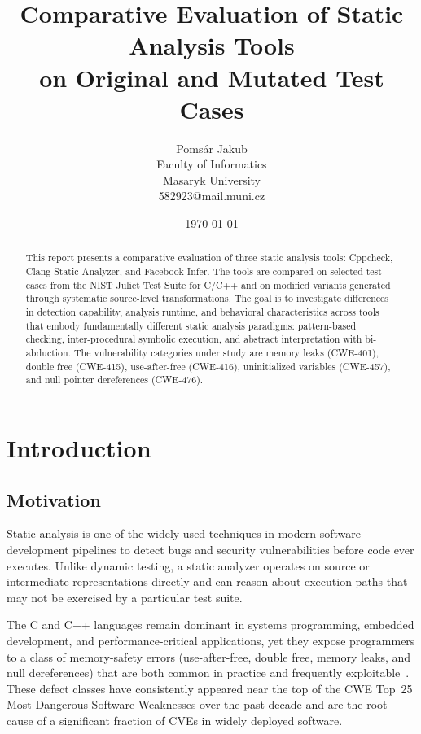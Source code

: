 \documentclass[11pt,a4paper]{article}
\title{Comparative Evaluation of Static Analysis Tools\\
on Original and Mutated Test Cases }
\author{Pomsár Jakub\\   
Faculty of Informatics\\   
Masaryk University\\
582923@mail.muni.cz }
\date{\today}
\begin{document}
\maketitle

\begin{abstract} This report presents a comparative evaluation of three static analysis tools: Cppcheck, Clang Static Analyzer, and Facebook Infer. The tools are compared on selected test cases from the NIST Juliet Test Suite for C/C++ and on modified variants generated through systematic source-level transformations. The goal is to investigate differences in detection capability, analysis runtime, and behavioral characteristics across tools that embody fundamentally different static analysis paradigms: pattern-based checking, inter-procedural symbolic execution, and abstract interpretation with bi-abduction. The vulnerability categories under study are memory leaks (CWE-401), double free (CWE-415), use-after-free (CWE-416), uninitialized variables (CWE-457), and null pointer dereferences (CWE-476).
\end{abstract}

\tableofcontents
\newpage

\section{Introduction} 
\subsection{Motivation}

Static analysis is one of the widely used techniques in modern software development pipelines to detect bugs and security vulnerabilities before code ever executes. Unlike dynamic testing, a static analyzer operates on source or intermediate representations directly and can reason about execution paths that may not be exercised by a particular test suite.

The C and C++ languages remain dominant in systems programming, embedded development, and performance-critical applications, yet they expose programmers to a class of memory-safety errors (use-after-free, double free, memory leaks, and null dereferences) that are both common in practice and frequently exploitable~\cite{cwe2023}. These defect classes have consistently appeared near the top of the CWE Top~25 Most Dangerous Software Weaknesses over the past decade and are the root cause of a significant fraction of CVEs in widely deployed software.
\end{document}
